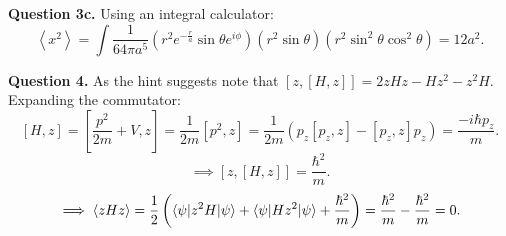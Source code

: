 \documentclass[letterpaper, reqno,11pt]{article}
\begin{document}
{\noindent\bf Question 3c.} Using an integral calculator: 
\[
\left<x^2 \right>=\int \frac{1}{64\pi a^{5}}\left( r^2e^{-\frac{r}{a}}\sin\theta e^{i\phi} \right)\left( r^2\sin\theta \right)  \left( r^2\sin^2\theta\cos^2\theta \right) =12a^2
.\]

{\noindent\bf Question 4.} As the hint suggests note that $[z, [H,z]]=2zHz-Hz^2-z^2H$. Expanding the commutator: 
\[
[H,z]=[\frac{p^2}{2m}+V,z]=\frac{1}{2m}[p^2,z]=\frac{1}{2m}\left( p_z[p_z,z]-[p_z,z]p_z \right)=\frac{-i\hbar p_z}{m}
.\]
\[
\implies [z,[H,z]]=\frac{\hbar^2}{m}
.\]
\[
\implies \left<zHz \right>=\frac{1}{2}\left(\braket{\psi|z^2H|\psi}+ \braket{\psi|Hz^2|\psi}+\frac{\hbar^2}{m} \right) =\frac{\hbar^2}{m}-\frac{\hbar^2}{m}=0
.\]
\end{document}
